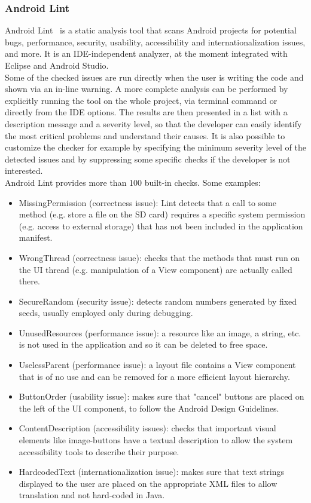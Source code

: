 \documentclass[11pt,a4paper,notitlepage]{article}
\begin{document}
\subsubsection{Android Lint}
Android Lint~\cite{Lint} is a static analysis tool that scans Android projects for potential bugs, performance, security, usability, accessibility and internationalization issues, and more. It is an IDE-independent analyzer, at the moment integrated with Eclipse and Android Studio.\medskip \\
Some of the checked issues are run directly when the user is writing the code and shown via an in-line warning. A more complete analysis can be performed by explicitly running the tool on the whole project, via terminal command or directly from the IDE options. The results are then presented in a list with a description message and a severity level, so that the developer can easily identify the most critical problems and understand their causes. It is also possible to customize the checker for example by specifying the minimum severity level of the detected issues and by suppressing some specific checks if the developer is not interested.\medskip \\
Android Lint provides more than 100 built-in checks. Some examples:
\begin{itemize}
	\item MissingPermission (correctness issue): Lint detects that a call to some method (e.g. store a file on the SD card) requires a specific system permission (e.g. access to external storage) that has not been included in the application manifest.
	\item WrongThread (correctness issue): checks that the methods that must run on the UI thread (e.g. manipulation of a View component) are actually called there.
	\item SecureRandom (security issue): detects random numbers generated by fixed seeds, usually employed only during debugging.
	\item UnusedResources (performance issue): a resource like an image, a string, etc. is not used in the application and so it can be deleted to free space.
	\item UselessParent (performance issue): a layout file contains a View component that is of no use and can be removed for a more efficient layout hierarchy.
	\item ButtonOrder (usability issue): makes sure that "cancel" buttons are placed on the left of the UI component, to follow the Android Design Guidelines.
	\item ContentDescription (accessibility issues): checks that important visual elements like image-buttons have a textual description to allow the system accessibility tools to describe their purpose.
	\item HardcodedText (internationalization issue): makes sure that text strings displayed to the user are placed on the appropriate XML files to allow translation and not hard-coded in Java.
\end{itemize}
\end{document}
